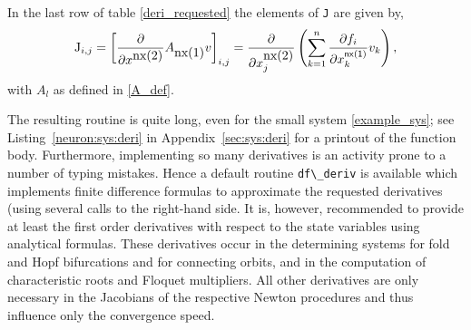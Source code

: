 \documentclass[10pt]{scrartcl}
\newcommand{\parm}[1]{\mathsf{#1}}
\newcommand{\blist}[1]{\mbox{\lstinline!#1!}}
\begin{document}
In the last row of table \ref{deri_requested} the elements of \blist{J}
are given by,
\[
\blist{J}_{i,j}=\left[\frac{\partial}{\partial x^{\blist{nx(2)}}}
A_{\blist{nx(1)}}v\right]_{i,j}
=\frac{\partial}{\partial x_j^{\blist{nx(2)}}}
\left(\sum_{k=1}^n\frac{\partial f_i}{\partial x_k^{\parm{nx(1)}}} v_k
\right),
\]
with $A_l$ as defined in \eqref{A_def}.


The resulting routine is quite long, even for the small system
\eqref{example_sys}; see Listing~\ref{neuron:sys:deri} in
Appendix~\ref{sec:sys:deri} for a printout of the function body.  Furthermore,
implementing so many derivatives is an activity prone to a number of
typing mistakes. Hence a default routine \blist{df\_deriv} is
available which implements finite difference formulas to approximate
the requested derivatives (using several calls to the right-hand
side. It is, however, recommended to provide at least the first order
derivatives with respect to the state variables using analytical
formulas. These derivatives occur in the determining systems for fold
and Hopf bifurcations
and for connecting orbits,  
and in the computation of characteristic roots and Floquet multipliers.
All other derivatives are only necessary in the 
Jacobians of the respective Newton procedures and thus
influence only the convergence speed. 
\end{document}
